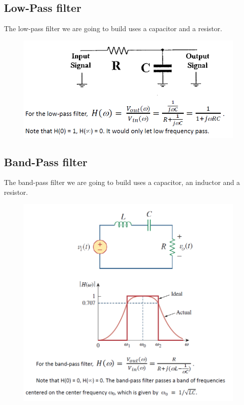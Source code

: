 \documentclass{article}
\begin{document}
\subsection{Low-Pass filter}

The low-pass filter we are going to build uses a capacitor and a resistor.

\begin{figure}[!h]
	\centering
	\includegraphics[width=12cm]{4.png}
	\label{fig-4}
\end{figure}

\subsection{Band-Pass filter}

The band-pass filter we are going to build uses a capacitor, an inductor and a resistor.

\begin{figure}[!h]
	\centering
	\includegraphics[width=12cm]{5.png}
	\label{fig-5}
\end{figure}
\end{document}
